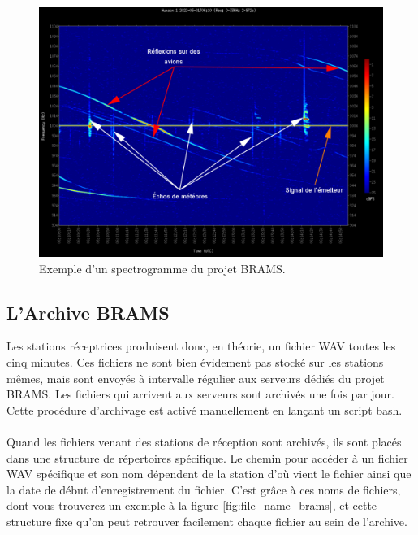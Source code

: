 \documentclass[11pt]{article}
\begin{document}
\begin{figure}[t]
    \begin{center}
        \includegraphics[scale=0.29]{spectrogramme_legend.png}
        \caption{Exemple d'un spectrogramme du projet BRAMS.}
        \label{fig:spectro_brams-a}
    \end{center}
\end{figure}

\subsection{L'Archive BRAMS}

Les stations réceptrices produisent donc, en théorie, un fichier WAV toutes les cinq minutes.
Ces fichiers ne sont bien évidement pas stocké sur les stations mêmes, mais sont envoyés à intervalle régulier aux serveurs dédiés du projet BRAMS.
Les fichiers qui arrivent aux serveurs sont archivés une fois par jour.
Cette procédure d'archivage est activé manuellement en lançant un script bash.\\
\\
Quand les fichiers venant des stations de réception sont archivés, ils sont placés dans une structure de répertoires spécifique.
Le chemin pour accéder à un fichier WAV spécifique et son nom dépendent de la station d'où vient le fichier ainsi que la date de début d'enregistrement du fichier.
C'est grâce à ces noms de fichiers, dont vous trouverez un exemple à la figure \ref{fig:file_name_brams}, et cette structure fixe qu'on peut retrouver facilement chaque fichier au sein de l'archive.\\
\end{document}
